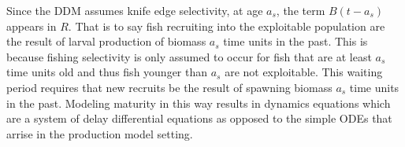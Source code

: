 %
Since the DDM assumes knife edge selectivity, at age $a_s$, the term
$B(t-a_s)$ appears in $R$. That is to say fish recruiting into the exploitable
population are the result of larval production of biomass $a_s$ time
units in the past. This is because fishing selectivity is only assumed to occur
for fish that are at least $a_s$ time units old and thus fish younger than $a_s$
are not exploitable. This waiting period requires that new recruits be the
result of spawning biomass $a_s$ time units in the past. Modeling maturity in
this way results in dynamics equations which are a system of delay differential
equations as opposed to the simple ODEs that arrise in the production model
setting.

%

